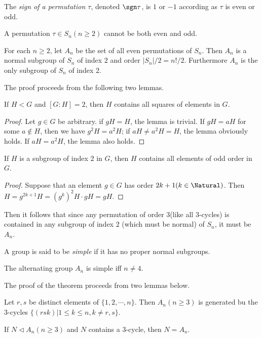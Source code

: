 The \textit{sign of a permutation $ \tau $}, denoted $ \sgn \tau $, is $ 1 $ or $ -1 $ according as $ \tau $ is even or odd.
\begin{Theorem}
	A permutation $ \tau \in S_n (n \geqslant 2)$ cannot be both even and odd.
\end{Theorem}
\begin{Theorem}
	For each $ n \geqslant 2 $, let $ A_n $ be the set of all even permutations of $ S_n $. Then $ A_n $ is a normal subgroup of $ S_n $ of index $ 2 $ and order $ |S_n|/2=n!/2 $. Furthermore $ A_n $ is the only subgroup of $ S_n $ of index $ 2 $.
\end{Theorem}
The proof proceeds from the following two lemmas.
\begin{Lemma}
	If $ H < G$  and $ [G:H]=2 $, then $ H $ contains all squares of elements in $ G $.
\end{Lemma}
\begin{proof}
	Let $ g \in G$ be arbitrary. if $ gH=H $, the lemma is trivial. If $ gH=aH $ for some $ a \notin H $, then we have $ g^2 H = a^2 H $; if $ aH \neq a^2 H=H $, the lemma obviously holds. If $ aH = a^2 H $, the lemma also holds.
\end{proof}
\begin{Lemma}
	If $ H $ is a subgroup of index $ 2 $ in $ G $, then $ H $ contains all elements of odd order in $ G $.
\end{Lemma}
\begin{proof}
	Suppose that an element $ g \in G $ has order $ 2k+1 (k \in \Natural)$. Then $ H = g^{2k+1}H=(g^{k})^2 H \cdot gH = gH $.
\end{proof}
Then it follows that since any permutation of order $ 3 $(like all $ 3 $-cycles) is contained in any subgroup of index $ 2 $ (which must be normal) of $ S_n $, it must be $ A_n $.
\begin{Definition}
	A group is said to be \textit{simple} if it has no proper normal subgroups.
\end{Definition}
\begin{Theorem}
	The alternating group $ A_n $ is simple iff $ n \neq 4 $.
\end{Theorem}
The proof of the theorem proceeds from two lemmas below.
\begin{Lemma}
	Let $ r,s $ be distinct elements of $ \{1,2,\cdots,n\} $. Then $ A_n (n\geqslant 3)$ is generated bu the $ 3 $-cycles $ \{(rsk)|1\leqslant k \leqslant n,k \neq r,s\} $.
\end{Lemma}
\begin{Lemma}
	If $ N \triangleleft A_n(n\geqslant 3)$  and $ N $ contains a $ 3 $-cycle, then $ N=A_n $.
\end{Lemma}
